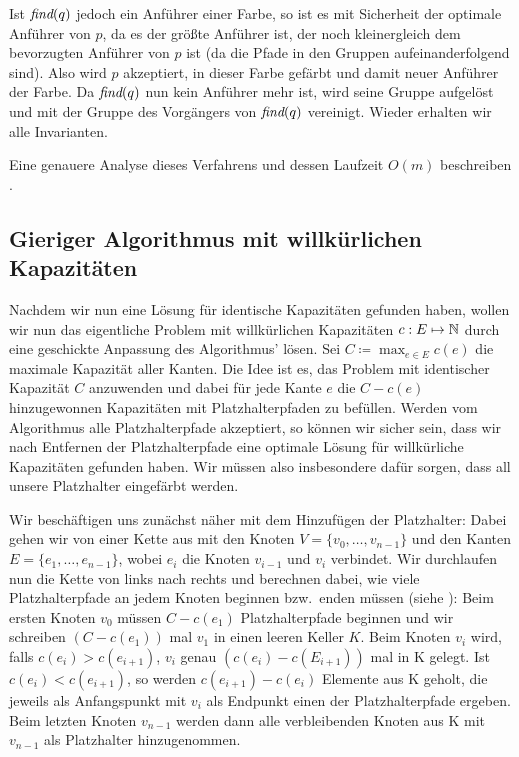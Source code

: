 Ist $\text{\em find}(q)$ jedoch ein Anführer einer Farbe, so ist es mit Sicherheit der optimale Anführer von $p$, da es der größte
Anführer ist, der noch kleinergleich dem bevorzugten Anführer von $p$ ist (da die Pfade in den Gruppen
aufeinanderfolgend sind).
Also wird $p$ akzeptiert, in dieser Farbe gefärbt und damit neuer Anführer der Farbe.
Da $\text{\em find}(q)$ nun kein Anführer mehr ist, wird seine Gruppe aufgelöst und mit der Gruppe des Vorgängers von $\text{\em find}(q)$
vereinigt.
Wieder erhalten wir alle Invarianten.

Eine genauere Analyse dieses Verfahrens und dessen Laufzeit $O(m)$ beschreiben .

\subsection{Gieriger Algorithmus mit willkürlichen Kapazitäten}\label{subsec:anpassenAnWillkürlicheKapazitäten}

Nachdem wir nun eine Lösung für identische Kapazitäten gefunden haben, wollen wir nun das eigentliche Problem mit
willkürlichen Kapazitäten $c: E \mapsto \mathbb N$ durch eine geschickte Anpassung des Algorithmus' lösen.
Sei $C \coloneqq \max_{e \in E} c(e)$ die maximale Kapazität aller Kanten.
Die Idee ist es, das Problem mit identischer Kapazität $C$ anzuwenden und dabei für jede Kante $e$ die $C - c(e)$
hinzugewonnen Kapazitäten mit Platzhalterpfaden zu befüllen.
Werden vom Algorithmus alle Platzhalterpfade akzeptiert, so können wir sicher sein, dass wir nach Entfernen der
Platzhalterpfade eine optimale Lösung für willkürliche Kapazitäten gefunden haben.
Wir müssen also insbesondere dafür sorgen, dass all unsere Platzhalter eingefärbt werden.

Wir beschäftigen uns zunächst näher mit dem Hinzufügen der Platzhalter:
Dabei gehen wir von einer Kette aus mit den Knoten $V=\{v_0,\dots,v_{n-1}\}$ und den Kanten
$E=\{e_1,\dots,e_{n-1}\}$, wobei $e_i$ die Knoten $v_{i-1}$ und $v_i$ verbindet.
Wir durchlaufen nun die Kette von links nach rechts und berechnen dabei, wie viele Platzhalterpfade an jedem Knoten
beginnen bzw.\ enden müssen (siehe ):
Beim ersten Knoten $v_0$ müssen $C - c(e_1)$ Platzhalterpfade beginnen und wir schreiben $(C - c(e_1))$ mal $v_1$ in einen
leeren Keller $K$.
Beim Knoten $v_i$ wird, falls $c(e_i) > c(e_{i+1})$, $v_i$ genau $(c(e_i) - c(E_{i+1}))$ mal in K gelegt.
Ist $c(e_i) < c(e_{i+1})$, so werden $c(e_{i+1}) - c(e_i)$ Elemente aus K geholt, die jeweils als Anfangspunkt mit $v_i$
als Endpunkt einen der Platzhalterpfade ergeben.
Beim letzten Knoten $v_{n-1}$ werden dann alle verbleibenden Knoten aus K mit $v_{n-1}$ als Platzhalter hinzugenommen.

